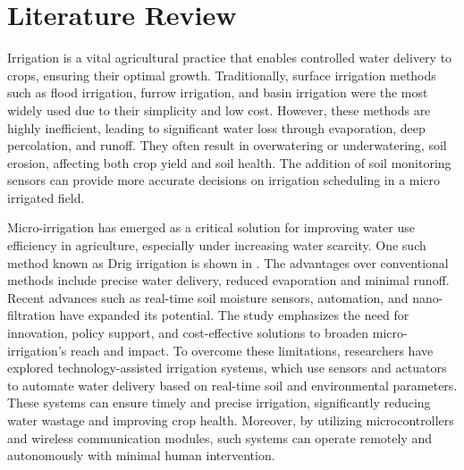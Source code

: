 \chapter{Literature Review}
\setlength\parindent{1cm}

Irrigation is a vital agricultural practice that enables controlled water delivery to crops, ensuring their optimal growth. Traditionally, surface irrigation methods such as flood irrigation, furrow irrigation, and basin irrigation were the most widely used due to their simplicity and low cost. However, these methods are highly inefficient, leading to significant water loss through evaporation, deep percolation, and runoff.  They often result in overwatering or underwatering, soil erosion, affecting both crop yield and soil health. The addition of soil monitoring sensors can provide more accurate decisions on irrigation scheduling in a micro irrigated field.\cite{gupta2022}

Micro-irrigation has emerged as a critical solution for improving water use efficiency in agriculture, especially under increasing water scarcity. One such method known as Drig irrigation is shown in . The advantages over conventional methods include precise water delivery, reduced evaporation and minimal runoff. Recent advances such as real-time soil moisture sensors, automation, and nano-filtration have expanded its potential. The study emphasizes the need for innovation, policy support, and cost-effective solutions to broaden micro-irrigation's reach and impact. To overcome these limitations, researchers have explored technology-assisted irrigation systems, which use sensors and actuators to automate water delivery based on real-time soil and environmental parameters. These systems can ensure timely and precise irrigation, significantly reducing water wastage and improving crop health. Moreover, by utilizing microcontrollers and wireless communication modules, such systems can  operate remotely and autonomously with minimal human intervention.\cite{kanthal2024}

